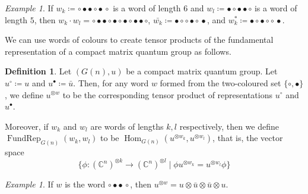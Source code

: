 \documentclass{article}
\DeclareMathOperator{\Hom}{Hom}
\DeclareMathOperator{\FundRep}{FundRep}
\theoremstyle{plain}
\theoremstyle{definition}
\newtheorem{definition}[theorem]{Definition}
\theoremstyle{remark}
\newtheorem{example}[theorem]{Example}
\begin{document}
\begin{example}
	If $w_k \coloneqq \circ \bullet \bullet \circ \bullet \, \circ$ 
	is a word of length $6$ and
	$w_l \coloneqq \bullet \circ \bullet \bullet \circ$ is a word of length $5$, then
	$w_k \cdot w_l = 
	\circ \bullet \bullet \circ \bullet \circ \bullet \circ \bullet \bullet \circ$,
	$\bar{w_k} \coloneqq \bullet \circ \circ \bullet \circ \, \bullet$, and
	$w_k^{*} \coloneqq \bullet \circ \bullet \circ \circ \, \bullet$.
\end{example}

We can use words of colours to create tensor products of the fundamental representation of a compact matrix quantum group as follows.

\begin{definition}
	Let $(G(n), u)$ be a compact matrix quantum group. 
	Let $u^{\circ} \coloneqq u$ and $u^{\bullet} \coloneqq \bar{u}$.
	Then, for any word $w$ formed from the two-coloured set
	$\{\circ, \bullet\}$,
	we define $u^{\otimes w}$ to be the corresponding tensor product of representations $u^{\circ}$ and $u^{\bullet}$.

	Moreover, if $w_k$ and $w_l$ are words of lengths $k, l$ respectively, 
	then we define $\FundRep_{G(n)}(w_k, w_l)$ to be 
	$\Hom_{G(n)}(u^{\otimes w_k}, u^{\otimes w_l})$, that is, the vector space
	\begin{equation}
	\{\phi: (\mathbb{C}^n)^{\otimes k} \rightarrow (\mathbb{C}^n)^{\otimes l} \mid \phi{u^{\otimes w_k}} = u^{\otimes w_l}\phi\}
	\end{equation}
\end{definition}

\begin{example}
	If $w$ is the word $\circ \bullet \bullet \, \circ$, then
	$u^{\otimes w} = u \otimes \bar{u} \otimes \bar{u} \otimes u$.
\end{example}
\end{document}
